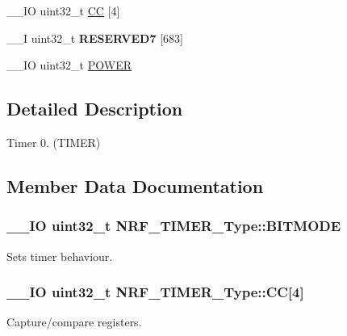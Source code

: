 \begin{DoxyCompactItemize}
\item 
\+\_\+\+\_\+\+I\+O uint32\+\_\+t \hyperlink{struct_n_r_f___t_i_m_e_r___type_a5b7630a14416703357d7979bb84063d2}{C\+C} \mbox{[}4\mbox{]}
\item 
\hypertarget{struct_n_r_f___t_i_m_e_r___type_a7ced83e1763ddb974ad4c13b16e9704a}{}\+\_\+\+\_\+\+I uint32\+\_\+t {\bfseries R\+E\+S\+E\+R\+V\+E\+D7} \mbox{[}683\mbox{]}\label{struct_n_r_f___t_i_m_e_r___type_a7ced83e1763ddb974ad4c13b16e9704a}

\item 
\+\_\+\+\_\+\+I\+O uint32\+\_\+t \hyperlink{struct_n_r_f___t_i_m_e_r___type_a3a0c5fbd77a8bb9b0a4d98cd2129606f}{P\+O\+W\+E\+R}
\end{DoxyCompactItemize}


\subsection{Detailed Description}
Timer 0. (T\+I\+M\+E\+R) 

\subsection{Member Data Documentation}
\hypertarget{struct_n_r_f___t_i_m_e_r___type_ae61db5f1fc79613887c93a27b1870b3c}{}
\subsubsection[{B\+I\+T\+M\+O\+D\+E}]{\setlength{\rightskip}{0pt plus 5cm}\+\_\+\+\_\+\+I\+O uint32\+\_\+t N\+R\+F\+\_\+\+T\+I\+M\+E\+R\+\_\+\+Type\+::\+B\+I\+T\+M\+O\+D\+E}\label{struct_n_r_f___t_i_m_e_r___type_ae61db5f1fc79613887c93a27b1870b3c}
Sets timer behaviour. \hypertarget{struct_n_r_f___t_i_m_e_r___type_a5b7630a14416703357d7979bb84063d2}{}
\subsubsection[{C\+C}]{\setlength{\rightskip}{0pt plus 5cm}\+\_\+\+\_\+\+I\+O uint32\+\_\+t N\+R\+F\+\_\+\+T\+I\+M\+E\+R\+\_\+\+Type\+::\+C\+C\mbox{[}4\mbox{]}}\label{struct_n_r_f___t_i_m_e_r___type_a5b7630a14416703357d7979bb84063d2}
Capture/compare registers. \hypertarget{struct_n_r_f___t_i_m_e_r___type_a6bb1defc578169c713a6aa27e7e3f96a}{}
